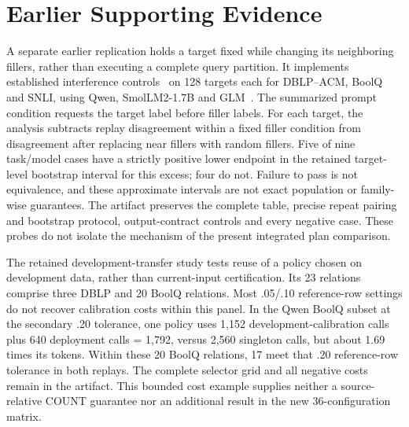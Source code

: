 \section{Earlier Supporting Evidence}
\label{sec:legacy}
A separate earlier replication holds a target fixed while changing its neighboring fillers, rather than executing a complete query partition. It implements established interference controls~\cite{company} on 128 targets each for DBLP--ACM, BoolQ and SNLI, using Qwen, SmolLM2-1.7B and GLM~\cite{leipzig2010,deepmatcher,boolq,snli,qwen,smol,glm}. The summarized prompt condition requests the target label before filler labels. For each target, the analysis subtracts replay disagreement within a fixed filler condition from disagreement after replacing near fillers with random fillers. Five of nine task/model cases have a strictly positive lower endpoint in the retained target-level bootstrap interval for this excess; four do not. Failure to pass is not equivalence, and these approximate intervals are not exact population or family-wise guarantees. The artifact preserves the complete table, precise repeat pairing and bootstrap protocol, output-contract controls and every negative case. These probes do not isolate the mechanism of the present integrated plan comparison.

The retained development-transfer study tests reuse of a policy chosen on development data, rather than current-input certification. Its 23 relations comprise three DBLP and 20 BoolQ relations. Most .05/.10 reference-row settings do not recover calibration costs within this panel. In the Qwen BoolQ subset at the secondary .20 tolerance, one policy uses 1,152 development-calibration calls plus 640 deployment calls = 1,792, versus 2,560 singleton calls, but about 1.69 times its tokens. Within these 20 BoolQ relations, 17 meet that .20 reference-row tolerance in both replays. The complete selector grid and all negative costs remain in the artifact. This bounded cost example supplies neither a source-relative COUNT guarantee nor an additional result in the new 36-configuration matrix.
